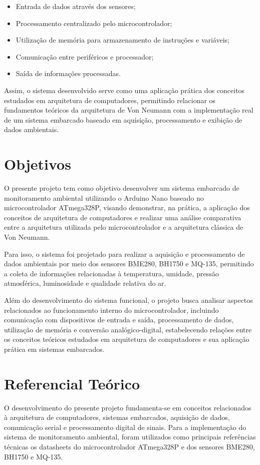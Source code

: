 \documentclass[a4paper,12pt]{article}
\begin{document}
\begin{itemize}
    \item Entrada de dados através dos sensores;
    \item Processamento centralizado pelo microcontrolador;
    \item Utilização de memória para armazenamento de instruções e variáveis;
    \item Comunicação entre periféricos e processador;
    \item Saída de informações processadas.
\end{itemize}

Assim, o sistema desenvolvido serve como uma aplicação prática dos conceitos estudados em arquitetura de computadores, permitindo relacionar os fundamentos teóricos da arquitetura de Von Neumann com a implementação real de um sistema embarcado baseado em aquisição, processamento e exibição de dados ambientais.

\section{Objetivos}
O presente projeto tem como objetivo desenvolver um sistema embarcado de monitoramento ambiental utilizando o Arduino Nano baseado no microcontrolador ATmega328P, visando demonstrar, na prática, a aplicação dos conceitos de arquitetura de computadores e realizar uma análise comparativa entre a arquitetura utilizada pelo microcontrolador e a arquitetura clássica de Von Neumann.

Para isso, o sistema foi projetado para realizar a aquisição e processamento de dados ambientais por meio dos sensores BME280, BH1750 e MQ-135, permitindo a coleta de informações relacionadas à temperatura, umidade, pressão atmosférica, luminosidade e qualidade relativa do ar.

Além do desenvolvimento do sistema funcional, o projeto busca analisar aspectos relacionados ao funcionamento interno do microcontrolador, incluindo comunicação com dispositivos de entrada e saída, processamento de dados, utilização de memória e conversão analógico-digital, estabelecendo relações entre os conceitos teóricos estudados em arquitetura de computadores e sua aplicação prática em sistemas embarcados.

\section{Referencial Teórico}
O desenvolvimento do presente projeto fundamenta-se em conceitos relacionados à arquitetura de computadores, sistemas embarcados, aquisição de dados, comunicação serial e processamento digital de sinais. Para a implementação do sistema de monitoramento ambiental, foram utilizados como principais referências técnicas os datasheets do microcontrolador ATmega328P e dos sensores BME280, BH1750 e MQ-135.
\end{document}
